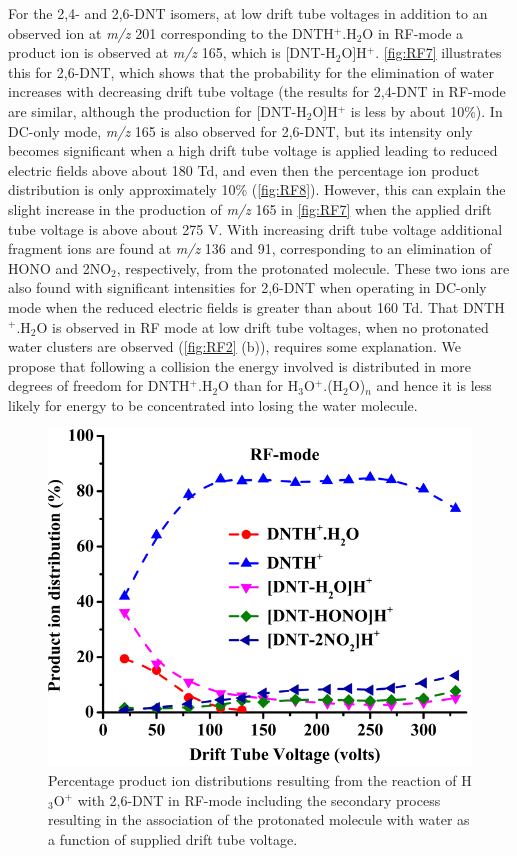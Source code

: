 For the 2,4- and 2,6-DNT isomers, at low drift tube voltages in addition to an observed ion at \textit{m/z} 201 corresponding to the DNTH$^+$.H$_2$O in RF-mode a product ion is observed at \textit{m/z} 165, which is [DNT-H$_2$O]H$^+$. \autoref{fig:RF7} illustrates this for 2,6-DNT, which shows that the probability for the elimination of water increases with decreasing drift tube voltage (the results for 2,4-DNT in RF-mode are similar, although the production for [DNT-H$_2$O]H$^+$ is less by about 10\%). In DC-only mode, \textit{m/z} 165 is also observed for 2,6-DNT, but its intensity only becomes significant when a high drift tube voltage is applied leading to reduced electric fields above about 180 Td, and even then the percentage ion product distribution is only approximately 10\% (\autoref{fig:RF8}). However, this can explain the slight increase in the production of \textit{m/z} 165 in \autoref{fig:RF7} when the applied drift tube voltage is above about 275 V. With increasing drift tube voltage additional fragment ions are found at \textit{m/z} 136 and 91, corresponding to an elimination of HONO and 2NO$_2$, respectively, from the protonated molecule. These two ions are also found with significant intensities for 2,6-DNT when operating in DC-only mode when the reduced electric fields is greater than about 160 Td. That DNTH$^+$.H$_2$O is observed in RF mode at low drift tube voltages, when no protonated water clusters are observed (\autoref{fig:RF2} (b)), requires some explanation. We propose that following a collision the energy involved is distributed in more degrees of freedom for DNTH$^+$.H$_2$O than for H$_3$O$^+$.(H$_2$O)$_n$ and hence it is less likely for energy to be concentrated into losing the water molecule.

\begin{figure}%
\centering
\includegraphics[height=0.3\textheight]{pics/RFpaper_fig7.png}
\caption{Percentage product ion distributions resulting from the reaction of H$_3$O$^+$ with 2,6-DNT in RF-mode including the secondary process resulting in the association of the protonated molecule with water as a function of supplied drift tube voltage.}
\label{fig:RF7}
\end{figure}

